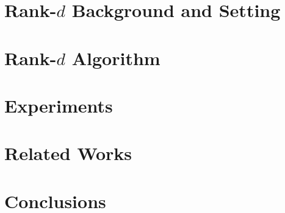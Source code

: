 \documentclass{article}
\begin{document}
\section{Rank-$d$ Background and Setting}
\label{sec:setting}


\section{Rank-$d$ Algorithm}
\label{sec:algorithm}


\section{Experiments}
\label{sec:experiments}

\vspace*{-1em}
\section{Related Works}
\label{sec:related}

\vspace*{-1em}
\section{Conclusions}
\label{sec:conclusions}





%
\end{document}
